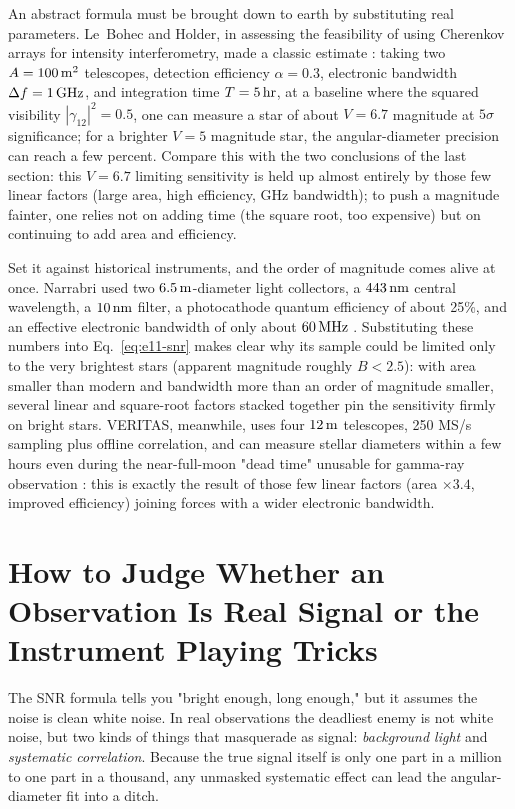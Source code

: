 An abstract formula must be brought down to earth by substituting real parameters. Le~Bohec and Holder, in assessing the feasibility of using Cherenkov arrays for intensity interferometry, made a classic estimate \citep{2006ApJ...649..399L}: taking two \(A=100\,{\rm m^2}\) telescopes, detection efficiency \(\alpha=0.3\), electronic bandwidth \(\Delta f=1\,{\rm GHz}\), and integration time \(T=5\,{\rm hr}\), at a baseline where the squared visibility \(|\gamma_{12}|^2=0.5\), one can measure a star of about \(V=6.7\) magnitude at \(5\sigma\) significance; for a brighter \(V=5\) magnitude star, the angular-diameter precision can reach a few percent. Compare this with the two conclusions of the last section: this \(V=6.7\) limiting sensitivity is held up almost entirely by those few linear factors (large area, high efficiency, GHz bandwidth); to push a magnitude fainter, one relies not on adding time (the square root, too expensive) but on continuing to add area and efficiency.

Set it against historical instruments, and the order of magnitude comes alive at once. Narrabri used two \(6.5\,{\rm m}\)-diameter light collectors, a \(443\,{\rm nm}\) central wavelength, a \(10\,{\rm nm}\) filter, a photocathode quantum efficiency of about 25\%, and an effective electronic bandwidth of only about \(60\,{\rm MHz}\) \citep{1967MNRAS.137..375H,1974MNRAS.167..121H,1974iiia.book.....H}. Substituting these numbers into Eq.~\eqref{eq:e11-snr} makes clear why its sample could be limited only to the very brightest stars (apparent magnitude roughly \(B<2.5\)): with area smaller than modern and bandwidth more than an order of magnitude smaller, several linear and square-root factors stacked together pin the sensitivity firmly on bright stars. VERITAS, meanwhile, uses four \(12\,{\rm m}\) telescopes, 250 MS/s sampling plus offline correlation, and can measure stellar diameters within a few hours even during the near-full-moon "dead time" unusable for gamma-ray observation \citep{2020NatAs...4.1164A}: this is exactly the result of those few linear factors (area \(\times3.4\), improved efficiency) joining forces with a wider electronic bandwidth.

\section{How to Judge Whether an Observation Is Real Signal or the Instrument Playing Tricks}
\label{sec:e11-feasibility}

The SNR formula tells you "bright enough, long enough," but it assumes the noise is clean white noise. In real observations the deadliest enemy is not white noise, but two kinds of things that masquerade as signal: \emph{background light} and \emph{systematic correlation}. Because the true signal itself is only one part in a million to one part in a thousand, any unmasked systematic effect can lead the angular-diameter fit into a ditch.

